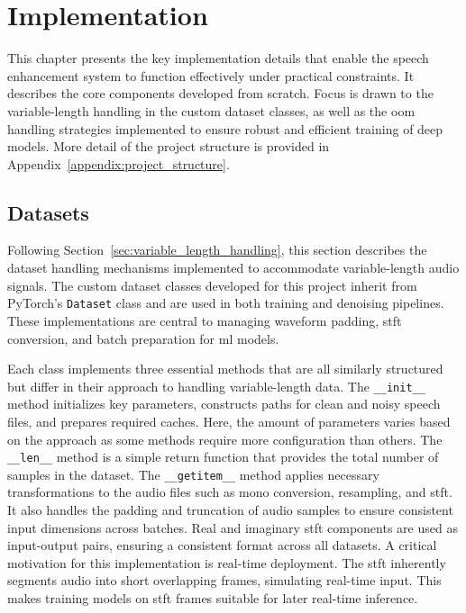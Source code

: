 \graphicspath{{content/chapters/6_implementation/figures/}}
\chapter{Implementation}
\label{chp:implementation}

This chapter presents the key implementation details that enable the speech enhancement system to function effectively under practical constraints. It describes the core components developed from scratch. Focus is drawn to the variable-length handling in the custom dataset classes, as well as the \gls{oom} handling strategies implemented to ensure robust and efficient training of deep models. More detail of the project structure is provided in Appendix~\ref{appendix:project_structure}.

\section{Datasets}
\label{sec:datasets}

Following Section~\ref{sec:variable_length_handling}, this section describes the dataset handling mechanisms implemented to accommodate variable-length audio signals. The custom dataset classes developed for this project inherit from PyTorch’s \texttt{Dataset} class and are used in both training and denoising pipelines. These implementations are central to managing waveform padding, \gls{stft} conversion, and batch preparation for \gls{ml} models.

Each class implements three essential methods that are all similarly structured but differ in their approach to handling variable-length data. The \texttt{\_\_init\_\_} method initializes key parameters, constructs paths for clean and noisy speech files, and prepares required caches. Here, the amount of parameters varies based on the approach as some methods require more configuration than others. The \texttt{\_\_len\_\_} method is a simple return function that provides the total number of samples in the dataset. The \texttt{\_\_getitem\_\_} method applies necessary transformations to the audio files such as mono conversion, resampling, and \gls{stft}. It also handles the padding and truncation of audio samples to ensure consistent input dimensions across batches. Real and imaginary \gls{stft} components are used as input-output pairs, ensuring a consistent format across all datasets. A critical motivation for this implementation is real-time deployment. The \gls{stft} inherently segments audio into short overlapping frames, simulating real-time input. This makes training models on \gls{stft} frames suitable for later real-time inference.

